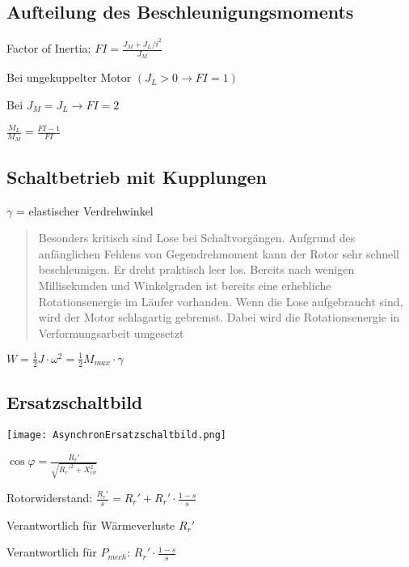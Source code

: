\documentclass[german]{latex4ei/latex4ei_sheet}
\begin{document}
	\begin{sectionbox}
		\subsection{Aufteilung des Beschleunigungsmoments}
			\begin{symbolbox}
				\item Factor of Inertia: $FI = \frac{J_M+J_L/i^2}{J_M}$ 
				\item Bei ungekuppelter Motor $(J_L > 0\rightarrow FI = 1)$
				\item Bei $J_M = J_L\rightarrow FI = 2$
				\item $\frac{M_L}{M_M} =\frac{FI-1}{FI}$
			\end{symbolbox}
		\subsection{Schaltbetrieb mit Kupplungen}
		\begin{bluebox}
			\item $\gamma$ = elastischer Verdrehwinkel
			\item \begin{quote}
				Besonders kritisch sind Lose bei Schaltvorgängen. Aufgrund des anfänglichen Fehlens
			von Gegendrehmoment kann der Rotor sehr schnell beschleunigen. Er dreht praktisch
			leer los. Bereits nach wenigen Millisekunden und Winkelgraden ist bereits eine erhebliche 
			Rotationsenergie im Läufer vorhanden. Wenn die Lose aufgebraucht sind, wird der
			Motor schlagartig gebremst. Dabei wird die Rotationsenergie in Verformungsarbeit umgesetzt
			\end{quote}
			\item $W = \frac{1}{2}J\cdot \omega^2 = \frac{1}{2}M_{max}\cdot \gamma$
		\end{bluebox}
		\subsection{Ersatzschaltbild}
			\begin{symbolbox}
				\item \texttt{[image: AsynchronErsatzschaltbild.png]}
				\item $\cos \varphi = \frac{R_r'}{\sqrt{R_r'^2+X_{r\sigma}^2}}$
				\item Rotorwiderstand: $\frac{R_r'}{s} = R_r' + R_r'\cdot \frac{1-s}{s}$
				\item Verantwortlich für Wärmeverluste $R_r'$
				\item Verantwortlich für $P_{mech}$: $R_r'\cdot \frac{1-s}{s}$
			\end{symbolbox}
	\end{sectionbox}
\end{document}
